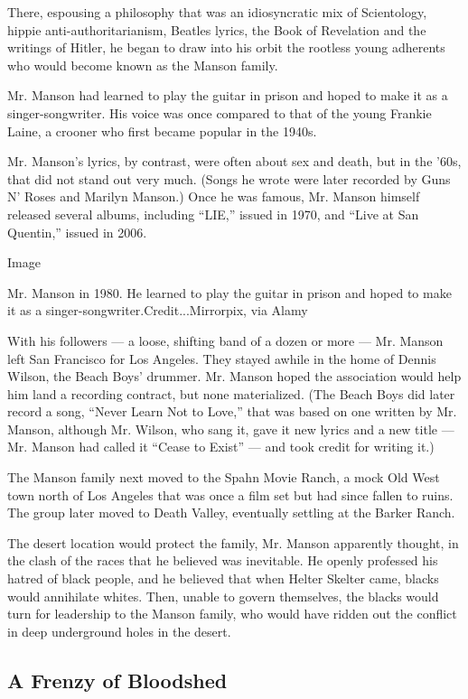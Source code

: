 There, espousing a philosophy that was an idiosyncratic mix of
Scientology, hippie anti-authoritarianism, Beatles lyrics, the Book of
Revelation and the writings of Hitler, he began to draw into his orbit
the rootless young adherents who would become known as the Manson
family.

Mr. Manson had learned to play the guitar in prison and hoped to make it
as a singer-songwriter. His voice was once compared to that of the young
Frankie Laine, a crooner who first became popular in the 1940s.

Mr. Manson's lyrics, by contrast, were often about sex and death, but in
the '60s, that did not stand out very much. (Songs he wrote were later
recorded by Guns N' Roses and Marilyn Manson.) Once he was famous, Mr.
Manson himself released several albums, including ``LIE,'' issued in
1970, and ``Live at San Quentin,'' issued in 2006.

Image

Mr. Manson in 1980. He learned to play the guitar in prison and hoped to
make it as a singer-songwriter.Credit...Mirrorpix, via Alamy

With his followers --- a loose, shifting band of a dozen or more --- Mr.
Manson left San Francisco for Los Angeles. They stayed awhile in the
home of Dennis Wilson, the Beach Boys' drummer. Mr. Manson hoped the
association would help him land a recording contract, but none
materialized. (The Beach Boys did later record a song, ``Never Learn Not
to Love,'' that was based on one written by Mr. Manson, although Mr.
Wilson, who sang it, gave it new lyrics and a new title --- Mr. Manson
had called it ``Cease to Exist'' --- and took credit for writing it.)

The Manson family next moved to the Spahn Movie Ranch, a mock Old West
town north of Los Angeles that was once a film set but had since fallen
to ruins. The group later moved to Death Valley, eventually settling at
the Barker Ranch.

The desert location would protect the family, Mr. Manson apparently
thought, in the clash of the races that he believed was inevitable. He
openly professed his hatred of black people, and he believed that when
Helter Skelter came, blacks would annihilate whites. Then, unable to
govern themselves, the blacks would turn for leadership to the Manson
family, who would have ridden out the conflict in deep underground holes
in the desert.

\hypertarget{a-frenzy-of-bloodshed}{%
\subsection{A Frenzy of Bloodshed}\label{a-frenzy-of-bloodshed}}

